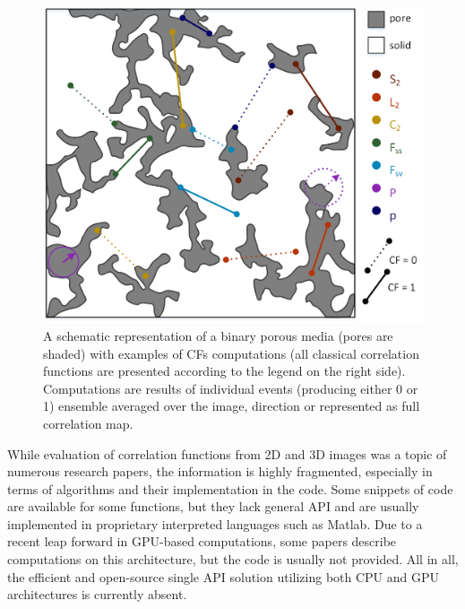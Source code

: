 \documentclass[1p]{elsarticle}
\begin{document}
\begin{figure}[ht]
  \centering
  \includegraphics[width=0.9\linewidth]{images/cf_1.png}
  \caption[]{A schematic representation of a binary porous media (pores are
    shaded) with examples of CFs computations (all classical correlation
    functions are presented according to the legend on the right
    side). Computations are results of individual events (producing either 0 or
    1) ensemble averaged over the image, direction or represented as full
    correlation map.}
  \label{fig:functions}
\end{figure}

While evaluation of correlation functions from 2D and 3D images was a topic of
numerous research papers, the information is highly fragmented, especially in
terms of algorithms and their implementation in the code. Some snippets of code
are available for some functions, but they lack general API and are usually
implemented in proprietary interpreted languages such as Matlab. Due to a recent
leap forward in GPU-based computations, some papers describe computations on
this architecture, but the code is usually not provided. All in all, the
efficient and open-source single API solution utilizing both CPU and GPU
architectures is currently absent.
\end{document}
